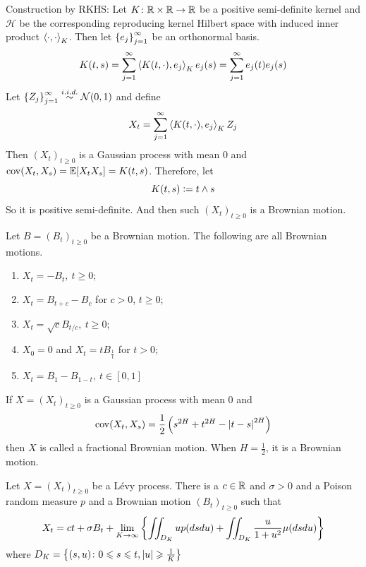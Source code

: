 \documentclass[a4paper,12pt]{article}
\begin{document}
\begin{itemize}
  \noindent Construction by RKHS: Let $K \colon \mathbb{R} \times \mathbb{R} \rightarrow \mathbb{R}$ be a positive semi-definite kernel and $\mathcal{H}$ be the corresponding reproducing kernel Hilbert space with induced inner product $\left\langle \cdot,\cdot \right\rangle_K$. Then let $\left\{e_j\right\}_{j=1}^{\infty}$ be an orthonormal basis.
  \begin{equation*}
    K(t,s) = \sum_{j=1}^{\infty} \left\langle K(t, \cdot), e_j \right\rangle_Ke_j(s) = \sum_{j=1}^{\infty} e_j(t)e_j(s)
  \end{equation*}
  Let $\left\{Z_j\right\}_{j=1}^{\infty} \overset{i.i.d.}{\sim} \mathcal{N}(0,1)$ and define
  \begin{equation*}
    X_t = \sum_{j=1}^{\infty}\left\langle K(t, \cdot), e_j \right\rangle_KZ_j
  \end{equation*}
  Then $(X_t)_{t \geqslant 0}$ is a Gaussian process with mean $0$ and $\operatorname{cov}(X_t,X_s) = \mathbb{E}[X_tX_s] = K(t,s)$. Therefore, let
  \begin{equation*}
    K(t,s) \vcentcolon= t \wedge s
  \end{equation*}
  So it is positive semi-definite. And then such $(X_t)_{t\geqslant 0}$ is a Brownian motion.

  \begin{cor}
    Let $B=(B_t)_{t \geqslant 0}$ be a Brownian motion. The following are all Brownian motions.
    \begin{enumerate}[label=(\arabic*)]
      \item $X_t = - B_t,~t \geqslant 0$;
      \item $X_t = B_{t+c} - B_c$ for $c > 0$, $t \geqslant 0$;
      \item $X_t = \sqrt{c}B_{t/c},~t \geqslant 0$;
      \item $X_0 = 0$ and $X_t = tB_{\frac{1}{t}}$ for $t> 0$;
      \item $X_t = B_1 - B_{1-t},~t \in [0,1]$
    \end{enumerate}
  \end{cor}

  \noindent If $X=(X_t)_{t \geqslant 0}$ is a Gaussian process with mean $0$ and
  \begin{equation*}
    \operatorname{cov}(X_t,X_s) = \frac{1}{2}\left(s^{2H}+t^{2H}-\left\lvert t-s\right\lvert^{2H}\right)
  \end{equation*}
  then $X$ is called a fractional Brownian motion. When $H=\frac{1}{2}$, it is a Brownian motion.

  \begin{thm}
    Let $X=(X_t)_{t \geqslant 0}$ be a L\'evy process. There is a $c \in \mathbb{R}$ and $\sigma > 0$ and a Poison random measure $p$ and a Brownian motion $(B_t)_{t \geqslant 0}$ such that
    \begin{equation*}
      X_t = ct + \sigma B_t + \lim_{K \rightarrow \infty}\left\{\iint_{D_K} u p(dsdu) + \iint_{D_K} \frac{u}{1+u^2} \mu(dsdu)\right\}
    \end{equation*}
    where $D_K = \left\{(s,u) \colon 0 \leqslant s \leqslant t, \left\lvert u\right\lvert\geqslant \frac{1}{K}\right\}$
  \end{thm}


\end{itemize}
\end{document}
